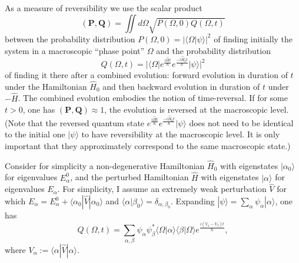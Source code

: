 \documentclass[12pt]{article}
\begin{document}
As a measure of reversibility we use the scalar product
\begin{equation}
({\mathbf P},{\mathbf Q}) =\iint d\Omega \sqrt{P(\Omega,0)Q(\Omega,t)}
\end{equation}
between the probability distribution $P(\Omega,0)= |\langle \Omega|\psi \rangle|^2$ of finding initially the system in a macroscopic ``phase point'' $\Omega$ and the probability distribution
\begin{equation}
Q(\Omega,t)= |\langle \Omega |e^{\frac{i\hat{H}t}{\hbar}}e^{\frac{-i\hat{H}_0t}{\hbar}}|\psi \rangle|^2
\end{equation}
of finding it there after a combined evolution: forward evolution in duration of $t$  under the Hamiltonian $\hat{H}_0$ and then backward evolution in duration of $t$ under $-\hat{H}$.
The combined evolution embodies the notion of time-reversal. If for some $t > 0$, one has $({\mathbf P},{\mathbf Q}) \approx 1$, the evolution is reversed at the macroscopic level. (Note that the reversed quantum state $e^{\frac{i\hat{H}t}{\hbar}}e^{\frac{-i\hat{H}_0t}{\hbar}}|\psi \rangle$ does not need to be identical to the initial one $|\psi\rangle$ to have reversibility at the macroscopic level. It is only important that they approximately correspond to the same macroscopic state.) 

Consider for simplicity a non-degenerative Hamiltonian $\hat{H}_0$ with eigenstates $|\alpha_0\rangle$ for eigenvalues $E^0_\alpha$, and the perturbed Hamiltonian $\hat{H}$ with eigenstates $|\alpha \rangle$ for eigenvalues $E_\alpha $. For simplicity, I assume an extremely weak perturbation $\hat{V}$ for which $E_\alpha=E^0_\alpha + \langle \alpha_0 |\hat{V} |\alpha_0 \rangle$ 
and $\langle \alpha | \beta_0\rangle=\delta_{\alpha,\beta_0}$. 
Expanding $|\psi\rangle=\sum_\alpha \psi_\alpha |\alpha\rangle$, one has
\begin{equation}
Q(\Omega, t)= \sum_{\alpha,\beta} \psi_\alpha \psi^{*}_\beta \langle \Omega |\alpha  \rangle \langle \beta|\Omega \rangle e^{\frac{i (V_\alpha - V_\beta) t}{\hbar}}, \label{rmt}
\end{equation}
where $V_\alpha:=\langle \alpha |\hat{V}|\alpha \rangle$. 
\end{document}
